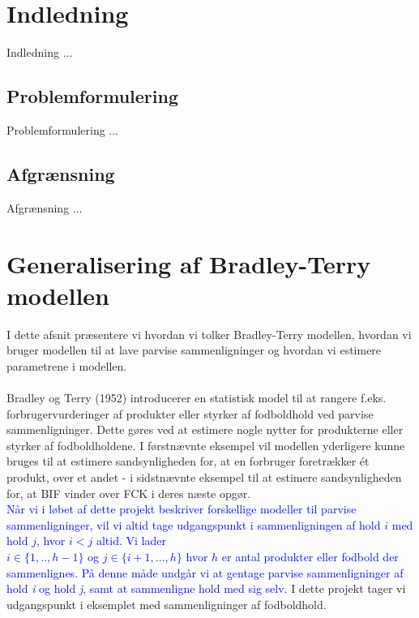 \documentclass[11pt,a4paper]{article}
\begin{document}
\section{Indledning}
Indledning ...
\subsection{Problemformulering}
Problemformulering ...
\subsection{Afgrænsning}
Afgrænsning ...
\section{Generalisering af Bradley-Terry modellen}
I dette afsnit præsentere vi hvordan vi tolker Bradley-Terry modellen, hvordan vi bruger modellen til at lave parvise sammenligninger og hvordan vi estimere parametrene i modellen.\\\\
Bradley og Terry (1952)\cite{BradleyTerry} introducerer en statistisk model til at rangere f.eks. forbrugervurderinger af produkter eller styrker af fodboldhold ved parvise sammenligninger. Dette gøres ved at estimere nogle nytter for produkterne eller styrker af fodboldholdene. I førstnævnte eksempel vil modellen yderligere kunne bruges til at estimere sandsynligheden for, at en forbruger foretrækker ét produkt, over et andet - i sidstnævnte eksempel til at estimere sandsynligheden for, at BIF vinder over FCK i deres næste opgør.\\
\textcolor{blue}{Når vi i løbet af dette projekt beskriver forskellige modeller til parvise sammenligninger, vil vi altid tage udgangspunkt i sammenligningen af hold $i$ med hold $j$, hvor $i<j$ altid. Vi lader \\$i \in \{1,..,h-1\}$ og $j\in \{i+1,...,h\}$ hvor $h$ er antal produkter eller fodbold der sammenlignes. På denne måde undgår vi at gentage parvise sammenligninger af hold \textit{i} og hold \textit{j}, samt at sammenligne hold med sig selv}.  I dette projekt tager vi udgangspunkt i eksemplet med sammenligninger af fodboldhold. 
\end{document}
